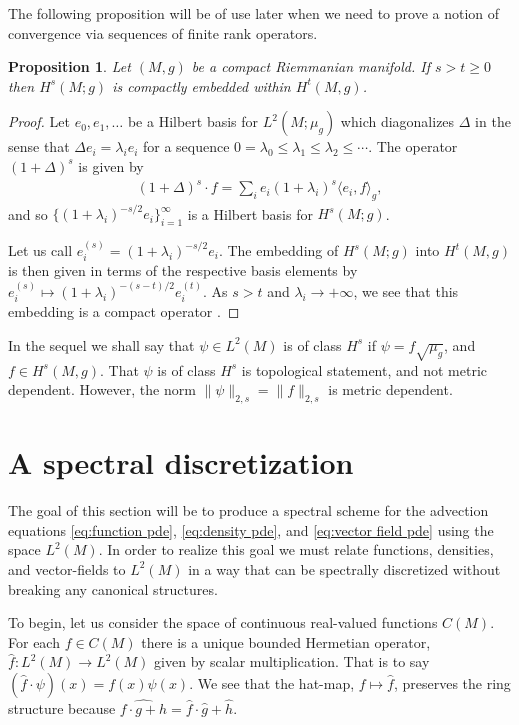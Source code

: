 \documentclass[12pt]{amsart}
\newtheorem{prop}[thm]{Proposition}
\begin{document}
The following proposition will be of use later when we need to prove a notion of convergence
via sequences of finite rank operators.

\begin{prop} \label{prop:compact_embedding}
	Let $(M,g)$ be a compact Riemmanian manifold.  If $s > t \geq 0$ then $H^s(M;g)$ is compactly embedded within $H^t(M,g)$.
\end{prop}
\begin{proof}
	Let $e_0, e_1,\dots$ be a Hilbert basis for $L^2(M;\mu_g)$ which diagonalizes $\Delta$
	in the sense that $\Delta e_i = \lambda_i e_i$ for a sequence $0 = \lambda_0 \leq \lambda_1 \leq \lambda_2 \leq \cdots$.
	The operator $(1+\Delta)^s$ is given by
	\begin{align*}
		(1+\Delta)^s \cdot f =  \sum_{i} e_i (1+\lambda_i)^s \langle e_i , f \rangle_g,
	\end{align*}
	and so $\{ (1+ \lambda_i)^{-s/2} e_i \}_{i=1}^{\infty}$ is a Hilbert basis for $H^s(M;g)$.
	
	Let us call $e_i^{(s)} = (1+ \lambda_i)^{-s/2} e_i$.
	The embedding of $H^s(M;g)$ into $H^t(M,g)$
	is then given in terms of the respective basis elements by $e_i^{(s)} \mapsto (1+\lambda_i)^{-(s-t)/2}e_i^{(t)}$.
	As $s > t$ and $\lambda_i \to +\infty$, we see that 
	this embedding is a compact operator \cite[see Proposition 4.6]{Conway1990}.
\end{proof}

In the sequel we shall say that $\psi \in L^2(M)$ is of class $H^s$ if $\psi = f \sqrt{\mu_g}$, and $f \in H^s(M,g)$.
That $\psi$ is of class $H^{s}$ is topological statement, and not metric dependent.
However, the norm $\| \psi \|_{2,s} = \| f \|_{2,s}$ is metric dependent.

\section{A spectral discretization}
The goal of this section will be to produce a spectral scheme for the advection equations \eqref{eq:function pde}, \eqref{eq:density pde}, and \eqref{eq:vector field pde}
using the space $L^{2}(M)$.
In order to realize this goal we must relate functions, densities, and vector-fields to $L^{2}(M)$ in a way that can be spectrally discretized without breaking any canonical structures.

To begin, let us consider the space of continuous real-valued functions $C(M)$.
For each $f \in C(M)$ there is a unique bounded Hermetian operator, $\hat{f} : L^{2}(M) \to L^{2}(M)$ given by scalar multiplication.
That is to say $(\hat{f} \cdot \psi) (x) = f(x) \psi(x)$.
We see that the hat-map, $f \mapsto \hat{f}$, preserves the ring structure because $\widehat{f \cdot g + h} = \hat{f} \cdot \hat{g} + \hat{h}$.
\end{document}
